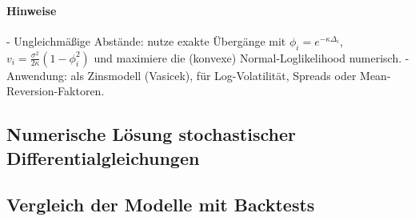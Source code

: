 \paragraph{Hinweise}
- Ungleichmäßige Abstände: nutze exakte Übergänge mit $\phi_i=e^{-\kappa\Delta_i}$, $v_i=\frac{\sigma^2}{2\kappa}(1-\phi_i^2)$ und maximiere die (konvexe) Normal-Loglikelihood numerisch.
- Anwendung: als Zinsmodell (Vasicek), für Log-Volatilität, Spreads oder Mean-Reversion-Faktoren.


\subsection{Numerische Lösung stochastischer Differentialgleichungen}

\subsection{Vergleich der Modelle mit Backtests}